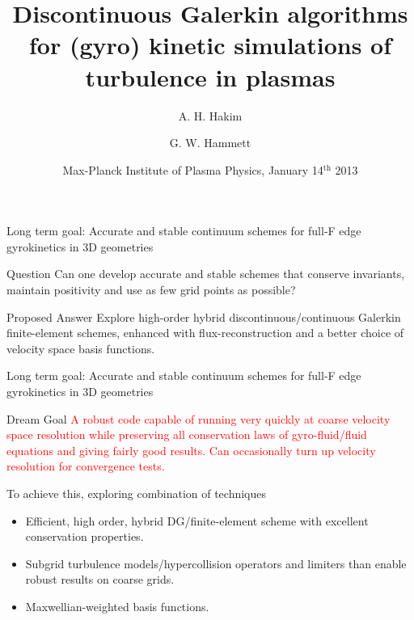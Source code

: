 \documentclass[pdf]{beamer}
\title[Continuum Discontinuous Galerkin Algorithms]{Discontinuous
  Galerkin algorithms for (gyro) kinetic simulations of turbulence in
  plasmas}%
\author{A. H. Hakim \and G. W. Hammett}%
\institute[http://www.ammar-hakim.org/sj] %
{
  Princeton Plasma Physics Laboratory, Princeton, NJ\\
  ammar@princeton.edu\\
  \url{http://www.ammar-hakim.org/sj}
}
\date[MPI/PU/PPPL]{Max-Planck Institute of Plasma Physics, January
  14$^\mathrm{th}$ 2013}
\newcommand{\mypause}{}
\theoremstyle{definition}
\begin{document}
\begin{frame}
  \titlepage
\end{frame}

\begin{frame}{Long term goal: Accurate and stable continuum schemes
    for full-F edge gyrokinetics in 3D geometries}

  \begin{block}{Question}
    \small
    Can one develop accurate and stable schemes that conserve
    invariants, maintain positivity and use as few grid points as
    possible?
  \end{block}
  \mypause
  \begin{block}{Proposed Answer}
    \small Explore high-order hybrid discontinuous/continuous Galerkin
    finite-element schemes, enhanced with flux-reconstruction and a
    better choice of velocity space basis functions.
  \end{block}

\end{frame}

\begin{frame}{Long term goal: Accurate and stable continuum schemes
    for full-F edge gyrokinetics in 3D geometries}

  \begin{block}{Dream Goal}
    \textcolor{red}{A robust code capable of running very quickly at
      coarse velocity space resolution while preserving all
      conservation laws of gyro-fluid/fluid equations and giving
      fairly good results. Can occasionally turn up velocity
      resolution for convergence tests.}
  \end{block}
  \mypause
  To achieve this, exploring combination of techniques
  \begin{itemize}
  \item Efficient, high order, hybrid DG/finite-element scheme with
    excellent conservation properties.
  \item Subgrid turbulence models/hypercollision operators and
    limiters than enable robust results on coarse grids.
  \item Maxwellian-weighted basis functions.
  \end{itemize}

\end{frame}
\end{document}

